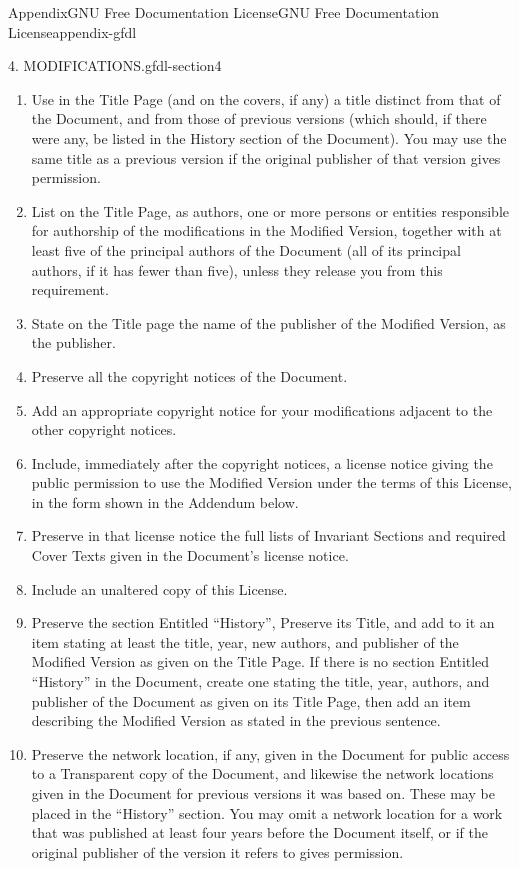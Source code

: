 \documentclass[oneside,10pt,]{book}
\numberwithin{equation}{section}
\begin{document}
\begin{appendixptx}{Appendix}{GNU Free Documentation License}{}{GNU Free Documentation License}{}{}{appendix-gfdl}
\begin{paragraphs}{4. MODIFICATIONS.}{gfdl-section4}
\begin{enumerate}[label={\Alph*.}]
\item{}Use in the Title Page (and on the covers, if any) a title distinct from that of the Document, and from those of previous versions (which should, if there were any, be listed in the History section of the Document). You may use the same title as a previous version if the original publisher of that version gives permission.%
\item{}List on the Title Page, as authors, one or more persons or entities responsible for authorship of the modifications in the Modified Version, together with at least five of the principal authors of the Document (all of its principal authors, if it has fewer than five), unless they release you from this requirement.%
\item{}State on the Title page the name of the publisher of the Modified Version, as the publisher.%
\item{}Preserve all the copyright notices of the Document.%
\item{}Add an appropriate copyright notice for your modifications adjacent to the other copyright notices.%
\item{}Include, immediately after the copyright notices, a license notice giving the public permission to use the Modified Version under the terms of this License, in the form shown in the Addendum below.%
\item{}Preserve in that license notice the full lists of Invariant Sections and required Cover Texts given in the Document's license notice.%
\item{}Include an unaltered copy of this License.%
\item{}Preserve the section Entitled ``History'', Preserve its Title, and add to it an item stating at least the title, year, new authors, and publisher of the Modified Version as given on the Title Page. If there is no section Entitled ``History'' in the Document, create one stating the title, year, authors, and publisher of the Document as given on its Title Page, then add an item describing the Modified Version as stated in the previous sentence.%
\item{}Preserve the network location, if any, given in the Document for public access to a Transparent copy of the Document, and likewise the network locations given in the Document for previous versions it was based on.  These may be placed in the ``History'' section. You may omit a network location for a work that was published at least four years before the Document itself, or if the original publisher of the version it refers to gives permission.%

\end{enumerate}
\end{paragraphs}
\end{appendixptx}
\end{document}
